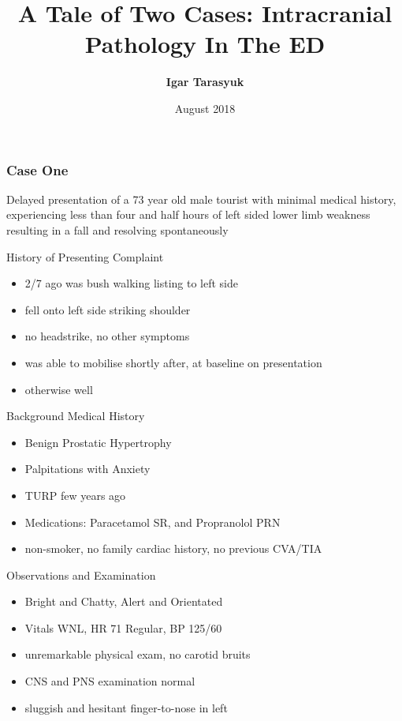 \documentclass[9pt, compress]{beamer}
\author{\textbf{Igar Tarasyuk}}
\title{A Tale of Two Cases: Intracranial Pathology In The ED}
\institute{\textbf{The Townsville Hospital}}
\date{August 2018}
\begin{document}
	\maketitle
	
    \begin{frame}
    	\frametitle{Case One}
        	Delayed presentation of a 73 year old male tourist with minimal medical history, experiencing less than four and half hours of left sided lower limb weakness resulting in a fall and resolving spontaneously
     \end{frame}
     \begin{frame}
     	History of Presenting Complaint
     	\begin{itemize}
        	\item 2/7 ago was bush walking listing to left side
            \item fell onto left side striking shoulder
            \item no headstrike, no other symptoms
            \item was able to mobilise shortly after, at baseline on presentation
            \item otherwise well
        \end{itemize}
     \end{frame}
     
     \begin{frame}
     	Background Medical History
        \begin{itemize}
        	\item Benign Prostatic Hypertrophy
            \item Palpitations with Anxiety
            \item TURP few years ago
            \item Medications: Paracetamol SR, and Propranolol PRN
            \item non-smoker, no family cardiac history, no previous CVA/TIA
        \end{itemize}
     \end{frame}
     
     \begin{frame}
     	Observations and Examination
        \begin{itemize}
        	\item Bright and Chatty, Alert and Orientated
            \item Vitals WNL, HR 71 Regular, BP 125/60
            \item unremarkable physical exam, no carotid bruits
            \item CNS and PNS examination normal
            \item sluggish and hesitant finger-to-nose in left
        \end{itemize}
     \end{frame}
     
\end{document}
